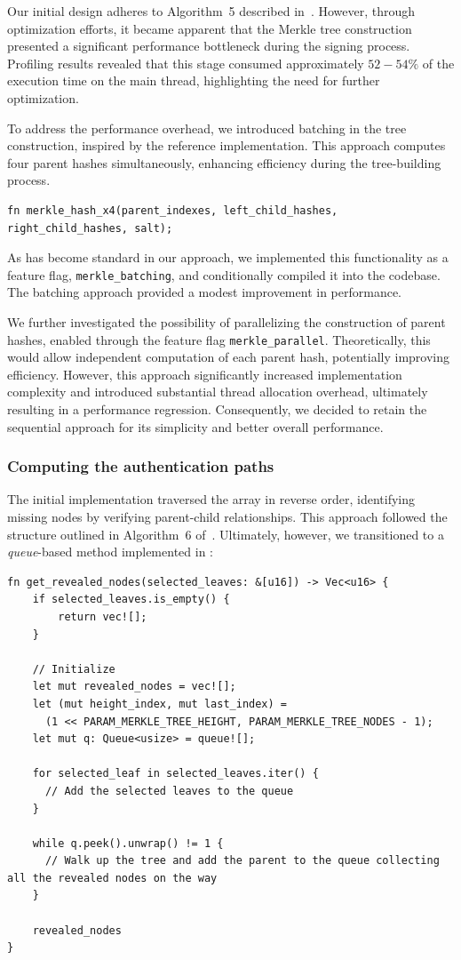 \documentclass[11pt]{report}
\theoremstyle{definition}
\theoremstyle{plain}
\begin{document}
Our initial design adheres to Algorithm~5 described in~\cite[p31]{aguilarsyndrome11}. However, through optimization efforts, it became apparent that the Merkle tree construction presented a significant performance bottleneck during the signing process. Profiling results revealed that this stage consumed approximately $52-54\%$ of the execution time on the main thread, highlighting the need for further optimization.

To address the performance overhead, we introduced batching in the tree construction, inspired by the reference implementation. This approach computes four parent hashes simultaneously, enhancing efficiency during the tree-building process.

\begin{verbatim}
fn merkle_hash_x4(parent_indexes, left_child_hashes, right_child_hashes, salt);
\end{verbatim}

As has become standard in our approach, we implemented this functionality as a feature flag, \texttt{merkle\_batching}, and conditionally compiled it into the codebase. The batching approach provided a modest improvement in performance.

We further investigated the possibility of parallelizing the construction of parent hashes, enabled through the feature flag \texttt{merkle\_parallel}. Theoretically, this would allow independent computation of each parent hash, potentially improving efficiency. However, this approach significantly increased implementation complexity and introduced substantial thread allocation overhead, ultimately resulting in a performance regression. Consequently, we decided to retain the sequential approach for its simplicity and better overall performance.

\subsubsection{Computing the authentication paths}\label{sub:auth_path}
The initial implementation traversed the array in reverse order, identifying missing nodes by verifying parent-child relationships. This approach followed the structure outlined in Algorithm~6 of~\cite[p30]{aguilarsyndrome11}. Ultimately, however, we transitioned to a \textit{queue}-based method implemented in :

\begin{verbatim}
fn get_revealed_nodes(selected_leaves: &[u16]) -> Vec<u16> {
    if selected_leaves.is_empty() {
        return vec![];
    }

    // Initialize
    let mut revealed_nodes = vec![];
    let (mut height_index, mut last_index) = 
      (1 << PARAM_MERKLE_TREE_HEIGHT, PARAM_MERKLE_TREE_NODES - 1);
    let mut q: Queue<usize> = queue![];

    for selected_leaf in selected_leaves.iter() {
      // Add the selected leaves to the queue
    }

    while q.peek().unwrap() != 1 {
      // Walk up the tree and add the parent to the queue collecting all the revealed nodes on the way
    }

    revealed_nodes
}
\end{verbatim}
\end{document}
